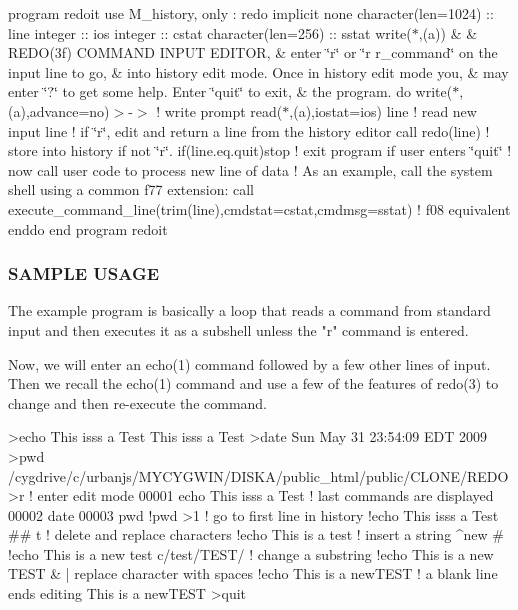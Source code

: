program redoit use M\+\_\+history, only \+: redo implicit none character(len=1024) \+:\+: line integer \+:\+: ios integer \+:\+: cstat character(len=256) \+:\+: sstat write($\ast$,\textquotesingle{}(a)\textquotesingle{}) \& \& \textquotesingle{}R\+E\+D\+O(3f) C\+O\+M\+M\+A\+ND I\+N\+P\+UT E\+D\+I\+T\+OR\textquotesingle{}, \& \textquotesingle{}enter \char`\"{}r\char`\"{} or \char`\"{}r r\+\_\+command\char`\"{} on the input line to go\textquotesingle{}, \& \textquotesingle{}into history edit mode. Once in history edit mode you\textquotesingle{}, \& \textquotesingle{}may enter \char`\"{}?\char`\"{} to get some help. Enter \char`\"{}quit\char`\"{} to exit\textquotesingle{}, \& \textquotesingle{}the program.\textquotesingle{} do write($\ast$,\textquotesingle{}(a)\textquotesingle{},advance=\textquotesingle{}no\textquotesingle{})\textquotesingle{}$>$-\/$>$\textquotesingle{} ! write prompt read($\ast$,\textquotesingle{}(a)\textquotesingle{},iostat=ios) line ! read new input line ! if \char`\"{}r\char`\"{}, edit and return a line from the history editor call redo(line) ! store into history if not \char`\"{}r\char`\"{}. if(line.\+eq.\textquotesingle{}quit\textquotesingle{})stop ! exit program if user enters \char`\"{}quit\char`\"{} ! now call user code to process new line of data ! As an example, call the system shell using a common f77 extension\+: call execute\+\_\+command\+\_\+line(trim(line),cmdstat=cstat,cmdmsg=sstat) ! f08 equivalent enddo end program redoit

\subsubsection*{S\+A\+M\+P\+LE U\+S\+A\+GE}

\begin{DoxyVerb}The example program is basically a loop that reads a command from
standard input and then executes it as a subshell unless the "r"
command is entered.

Now, we will enter an echo(1) command followed by a few other lines
of input. Then we recall the echo(1) command and use a few of the
features of redo(3) to change and then re-execute the command.

   >echo This isss a Test
   This isss a Test
   >date
   Sun May 31 23:54:09 EDT 2009
   >pwd
   /cygdrive/c/urbanjs/MYCYGWIN/DISKA/public_html/public/CLONE/REDO
   >r                            ! enter edit mode
   00001 echo This isss a Test   ! last commands are displayed
   00002 date
   00003 pwd
   !pwd
   >1                            ! go to first line in history
   !echo This isss a Test
                ##   t           ! delete and replace characters
   !echo This is a test          ! insert a string
                   ^new #
   !echo This is a new test
   c/test/TEST/                  ! change a substring
   !echo This is a new TEST
                      &          | replace character with spaces
   !echo This is a newTEST
                                 ! a blank line ends editing
   This is a newTEST
   >quit
\end{DoxyVerb}


